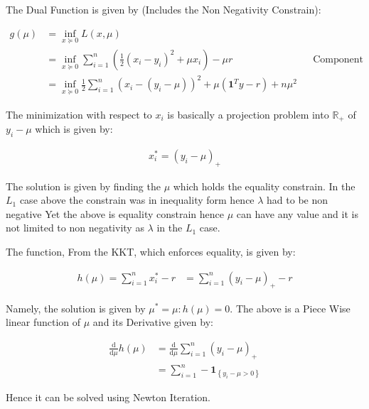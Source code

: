 \documentclass[]{article}
\newcommand{\MyParen}[1]{\left( #1 \right)}
\begin{document}
	The Dual Function is given by (Includes the Non Negativity Constrain):
	
	\begin{align*}
	g \left( \mu \right) & = \inf_{x \succeq 0} L \left( x, \mu \right) && \text{} \\
	& = \inf_{x \succeq 0} \sum_{i = 1}^{n} \left( \frac{1}{2} { \left( {x}_{i} - {y}_{i} \right) }^{2} + \mu {x}_{i} \right) - \mu r && \text{Component wise form} \\
	& = \inf_{x \succeq 0} \frac{1}{2} \sum_{i = 1}^{n} \left( {x}_{i} - \left( {y}_{i} - \mu \right) \right)^{2} + \mu \left( \boldsymbol{1}^{T} y - r \right) + n {\mu}^{2}
	\end{align*}
	
	The minimization with respect to $ {x}_{i} $ is basically a projection problem into $ \mathbb{R}_{+} $ of $ {y}_{i} - \mu $ which is given by:
	
	\begin{align*}
	{x}_{i}^{\ast} = { \left( {y}_{i} - \mu \right) }_{+}
	\end{align*}
	
	The solution is given by finding the $ \mu $ which holds the equality constrain. In the $ {L}_{1} $ case above the constrain was in inequality form hence $ \lambda $ had to be non negative Yet the above is equality constrain hence $ \mu $ can have any value and it is not limited to non negativity as $ \lambda $ in the $ {L}_{1} $ case.
	
	The function, From the KKT, which enforces equality, is given by:
	
	\begin{align*}
	h \left( \mu \right) = \sum_{i = 1}^{n} {x}_{i}^{\ast} - r & = \sum_{i = 1}^{n} { \left( {y}_{i} - \mu \right) }_{+} - r
	\end{align*}
	
	Namely, the solution is given by $ {\mu}^{\ast} = \mu : h \MyParen{\mu} = 0 $. The above is a Piece Wise linear function of $ \mu $ and its Derivative given by:
	
	\begin{align*}
	\frac{\mathrm{d} }{\mathrm{d} \mu} h \left( \mu \right) & = \frac{\mathrm{d} }{\mathrm{d} \mu} \sum_{i = 1}^{n} { \left( {y}_{i} - \mu \right) }_{+} \\
	& = \sum_{i = 1}^{n} -{ \mathbf{1} }_{\left\{ {y}_{i} - \mu > 0 \right\}}
	\end{align*}
	
	Hence it can be solved using Newton Iteration.
	
\end{document}
